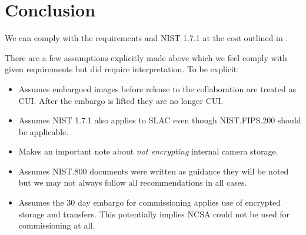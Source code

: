 \section{Conclusion}\label{sec:conc}
We can comply with the requirements and NIST 1.7.1 at the cost outlined in .

There are a few assumptions explicitly made above which we feel comply with given requirements but did require interpretation. To be explicit:
\begin{itemize}
\item {} Assumes embargoed images before release to the collaboration are treated as CUI. After the embargo is lifted they are no longer CUI.
\item {} Assumes NIST 1.7.1 also applies to SLAC even though NIST.FIPS.200 should be applicable.
\item {} Makes an important note about \emph{not encrypting} internal camera storage.
\item {} Assumes NIST.800 documents were written as guidance  they will be noted but we may not always follow all recommendations in all cases.
\item {} Assumes the 30 day embargo for commissioning applies use of encrypted storage and transfers. This potentially implies NCSA could not be used for commissioning at all.

\end{itemize}
